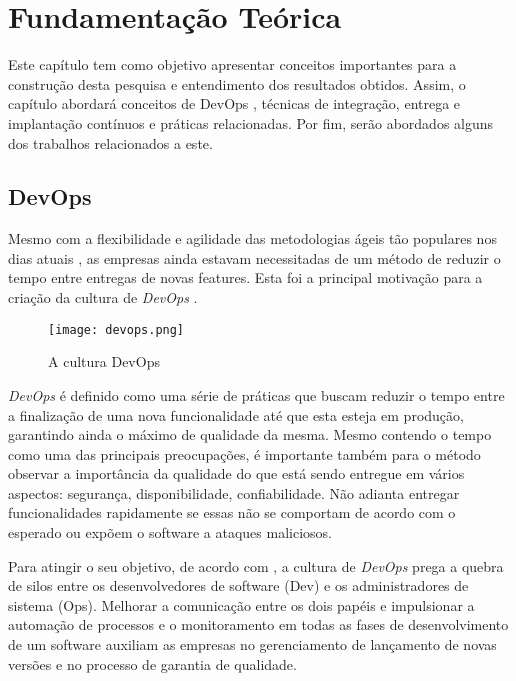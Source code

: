 \chapter{Fundamentação Teórica}

Este capítulo tem como objetivo apresentar conceitos importantes para a
construção desta pesquisa e entendimento dos resultados obtidos. Assim, o capítulo abordará conceitos de DevOps \cite{devopsWiki}, técnicas de integração, entrega e implantação contínuos \cite{fowlerCI, fowlerCD} e práticas relacionadas. Por fim, serão abordados alguns dos trabalhos relacionados a este.

\section{DevOps}

Mesmo com a flexibilidade e agilidade das metodologias ágeis tão populares nos dias atuais \cite{agileSoftwareDevelopment}, as empresas ainda estavam necessitadas de um método de reduzir o tempo entre entregas de novas features. Esta foi a principal motivação para a criação da cultura de \emph{DevOps} \cite{devopsBook}. 

\begin{figure}[ht]
\begin{center}
\texttt{[image: devops.png]}
\end{center}
\caption[A cultura DevOps]{
    A cultura DevOps
}\label{devops}
\end{figure}

\emph{DevOps} é definido como uma série de práticas que buscam reduzir o tempo entre a finalização de uma nova funcionalidade até que esta esteja em produção, garantindo ainda o máximo de qualidade da mesma. Mesmo contendo o tempo como uma das principais preocupações, é importante também para o método observar a importância da qualidade do que está sendo entregue em vários aspectos: segurança, disponibilidade, confiabilidade. Não adianta entregar funcionalidades rapidamente se essas não se comportam de acordo com o esperado ou expõem o software a ataques maliciosos.

Para atingir o seu objetivo, de acordo com \cite{devopsWiki}, a cultura de \emph{DevOps} prega a quebra de silos entre os desenvolvedores de software (Dev) e os administradores de sistema (Ops). Melhorar a comunicação entre os dois papéis e impulsionar a automação de processos e o monitoramento em todas as fases de desenvolvimento de um software auxiliam as empresas no gerenciamento de lançamento de novas versões e no processo de garantia de qualidade.

